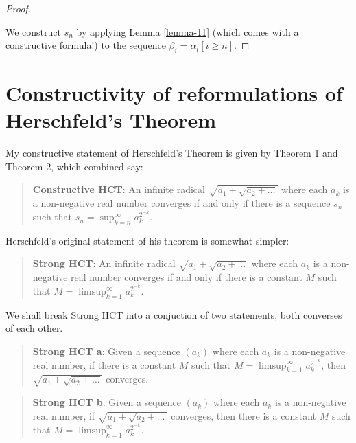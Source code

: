 \documentclass[
]{article}
\theoremstyle{theorem}
\theoremstyle{lemma}
\theoremstyle{corollary}
\theoremstyle{remark}
\theoremstyle{definition}
\begin{document}
\begin{proof}
\hypertarget{proof-15}{%
\label{proof-15}}
We construct \(s_n\) by applying Lemma \ref{lemma-11} (which comes with a constructive formula!) to the sequence \(\beta_i = \alpha_i[i \geq n]\).

\end{proof}
\hypertarget{constructivity-of-reformulations-of-herschfelds-theorem}{%
\section{Constructivity of reformulations of Herschfeld's Theorem}\label{constructivity-of-reformulations-of-herschfelds-theorem}}

My constructive statement of Herschfeld's Theorem is given by Theorem 1 and Theorem 2, which combined say:

\begin{quote}
\textbf{Constructive HCT}: An infinite radical \(\sqrt{a_1 + \sqrt{a_2 + \dots}}\) where each \(a_k\) is a non-negative real number converges if and only if there is a sequence \(s_n\) such that \(s_n = \sup_{k=n}^\infty a_k^{2^{-k}}\).
\end{quote}

Herschfeld's original statement of his theorem is somewhat simpler:

\begin{quote}
\textbf{Strong HCT}: An infinite radical \(\sqrt{a_1 + \sqrt{a_2 + \dots}}\) where each \(a_k\) is a non-negative real number converges if and only if there is a constant \(M\) such that \(M = \limsup_{k=1}^\infty a_k^{2^{-k}}\).
\end{quote}

We shall break Strong HCT into a conjuction of two statements, both converses of each other.

\begin{quote}
\textbf{Strong HCT a}: Given a sequence \((a_k)\) where each \(a_k\) is a non-negative real number, if there is a constant \(M\) such that \(M = \limsup_{k=1}^\infty a_k^{2^{-k}}\), then \(\sqrt{a_1 + \sqrt{a_2 + \dots}}\) converges.
\end{quote}

\begin{quote}
\textbf{Strong HCT b}: Given a sequence \((a_k)\) where each \(a_k\) is a non-negative real number, if \(\sqrt{a_1 + \sqrt{a_2 + \dots}}\) converges, then there is a constant \(M\) such that \(M = \limsup_{k=1}^\infty a_k^{2^{-k}}\).
\end{quote}
\end{document}
